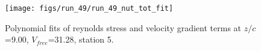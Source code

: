 \begin{figure}[H]
\centering
\texttt{[image: figs/run\_49/run\_49\_nut\_tot\_fit]}
\caption{Polynomial fits of reynolds stress and velocity gradient terms at $z/c$=9.00, $V_{free}$=31.28, station 5.}
\label{fig:run_49_nut_tot_fit}
\end{figure}


